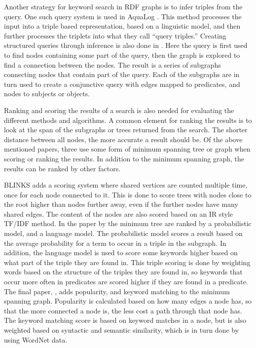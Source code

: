 Another strategy for keyword search in RDF graphs is to infer triples from the query. One such query system is used in AquaLog \citep{aqualog}. This method processes the input into a triple based representation, based on a linguistic model, and then further processes the triplets into what they call ``query triples.'' Creating structured queries through inference is also done in \citep{4812421}. Here the query is first used to find nodes containing some part of the query, then the graph is explored to find a connection between the nodes. The result is a series of subgraphs connecting nodes that contain part of the query. Each of the subgraphs are in turn used to create a conjunctive query with edges mapped to predicates, and nodes to subjects or objects.

Ranking and scoring the results of a search is also needed for evaluating the different methods and algorithms. A common element for ranking the results is to look at the span of the subgraphs or trees returned from the search. The shorter distance between all nodes, the more accurate a result should be. Of the above mentioned papers, three \citep{blinks, Elbassuoni:2011:KSO:2063576.2063615, 4812421} use some form of minimum spanning tree or graph when scoring or ranking the results. In addition to the minimum spanning graph, the results can be ranked by other factors. 

BLINKS adds a scoring system where shared vertices are counted multiple time, once for each node connected to it. This is done to score trees with nodes close to the root higher than nodes further away, even if the further nodes have many shared edges. The content of the nodes are also scored based on an IR style TF/IDF method. In the paper by \cite{Elbassuoni:2011:KSO:2063576.2063615} the minimum tree are ranked by a probabilistic model, and a language model. The probabilistic model scores a result based on the average probability for a term to occur in a triple in the subgraph. In addition, the language model is used to score some keywords higher based on what part of the triple they are found in. This triple scoring is done by weighting words based on the structure of the triples they are found in, so keywords that occur more often in predicates are scored higher if they are found in a predicate. The final paper, \cite{4812421}, adds popularity, and keyword matching to the minimum spanning graph. Popularity is calculated based on how many edges a node has, so that the more connected a node is, the less cost a path through that node has. The keyword matching score is based on keyword matches in a node, but is also weighted based on syntactic and semantic similarity, which is in turn done by using WordNet data.

